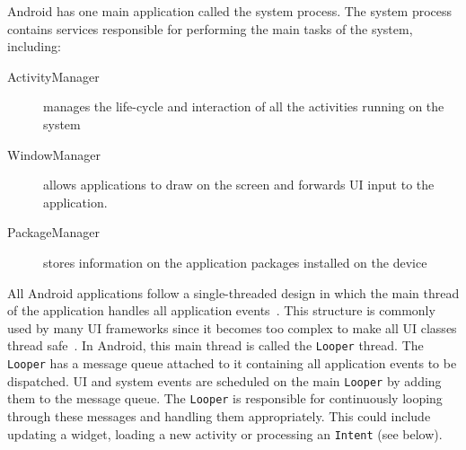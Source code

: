 \documentclass{acm_proc_article-sp}
\begin{document}
Android has one main application called the system process. The system process contains services responsible for performing the main
tasks of the system, including:
\vspace{-10pt}
\begin{description}
 \item [ActivityManager] manages the life-cycle and interaction of all the activities running on the system
 \item [WindowManager] allows applications to draw on the screen and forwards UI input to the application.
 \item [PackageManager] stores information on the application packages installed on the device
\end{description}
\vspace{-5pt}
All Android applications follow a single-threaded design in which the main thread of the application handles all application
events~\cite{AndroidDocs}. This structure is commonly used by many UI frameworks since it becomes too complex to make all UI classes thread
safe~\cite{SingleThread}. In Android, this main thread is called the \texttt{Looper} thread. The \texttt{Looper} has a message queue
attached to it containing all application events to be dispatched. UI and system events are scheduled on the main \texttt{Looper} by adding
them to the message queue. The \texttt{Looper} is responsible for continuously looping through these messages and handling them
appropriately. This could include updating a widget, loading a new activity or processing an \texttt{Intent} (see below).
\end{document}
